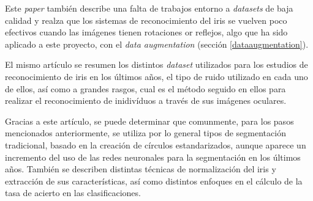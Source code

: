  Este \textit{paper} también describe una falta de trabajos entorno a \textit{datasets} de baja calidad y realza que los sistemas de reconocimiento del iris se vuelven 
 poco efectivos cuando las imágenes tienen rotaciones or reflejos, algo que ha sido aplicado a este proyecto, con el \textit{data augmentation} (sección \ref{dataaugmentation}).

 El mismo artículo se resumen los distintos \textit{dataset} utilizados para los estudios de reconocimiento de iris en los últimos años, el tipo de ruido utilizado en cada uno de ellos,
 así como a grandes rasgos, cual es el método seguido en ellos para realizar el reconocimiento de inidivíduos a través de sus imágenes oculares.
 
 Gracias a este artículo, se puede determinar que comunmente, para los pasos mencionados anteriormente, se utiliza por lo general tipos de segmentación tradicional, basado en la creación de círculos estandarizados, aunque aparece un incremento del uso de las redes neuronales para la segmentación en los últimos años.
 También se describen distintas técnicas de normalización del iris y extracción de sus características, así como distintos enfoques en el cálculo de la tasa de acierto en las clasificaciones.






